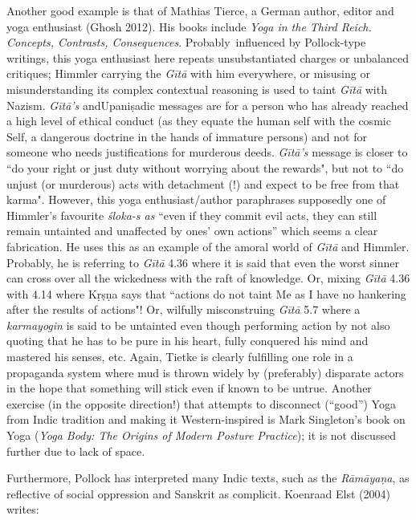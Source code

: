Another good example is that of Mathias Tierce, a German author, editor and yoga enthusiast (Ghosh 2012). His books include {\sl Yoga in the Third Reich. Concepts, Contrasts, Consequences}. Probably~influenced by Pollock-type writings, this yoga enthusiast here repeats unsubstantiated charges or unbalanced critiques; Himmler carrying the {\sl Gītā} with him everywhere, or misusing or misunderstanding its complex contextual reasoning is used to taint {\sl Gītā} with Nazism. {\sl Gītā's} and\break Upaniṣadic messages are for a person who has already reached a high level of ethical conduct (as they equate the human self with the cosmic Self, a dangerous doctrine in the hands of immature persons) and not for someone who needs justifications for murderous deeds. {\sl Gītā's} message is closer to ``do your right or just duty without worrying about the rewards", but not to ``do unjust (or murderous) acts with detachment (!) and expect to be free from that karma". However, this yoga enthusiast/author paraphrases supposedly one of Himmler's favourite {\sl śloka-s as} ``even if they commit evil acts, they can still remain untainted and unaffected by ones' own actions” which seems a clear fabrication. He uses this as an example of the amoral world of {\sl Gītā} and Himmler. Probably, he is referring to {\sl Gītā} 4.36 where it is said that even the worst sinner can cross over all the wickedness with the raft of knowledge. Or, mixing {\sl Gītā} 4.36 with 4.14 where Kṛṣṇa says that ``actions do not taint Me as I have no hankering after the results of actions"! Or, wilfully misconstruing {\sl Gītā} 5.7 where a {\sl karmayogin} is said to be untainted even though performing action by not also quoting that he has to be pure in his heart, fully conquered his mind and mastered his senses, etc. Again, Tietke is clearly fulfilling one role in a propaganda system where mud is thrown widely by (preferably) disparate actors in the hope that something will stick even if known to be untrue. Another exercise (in the opposite direction!) that attempts to disconnect (“good”) Yoga from Indic tradition and making it Western-inspired is Mark Singleton’s book on Yoga ({\sl Yoga Body: The Origins of Modern Posture Practice}); it is not discussed further due to lack of space.

Furthermore, Pollock has interpreted many Indic texts, such as the {\sl Rāmāyaṇa}, as reflective of social oppression and Sanskrit as complicit. Koenraad Elst (2004) writes: 

